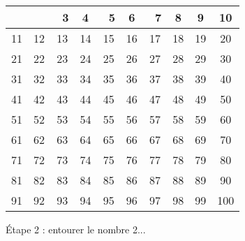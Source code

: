 \documentclass[a4paper]{beamer}
\begin{document}
\begin{frame}
	\begin{center}
		\begin{tabular}{|c|c|c|c|c|c|c|c|c|c|}
			\hline
			\xcancel{1} & \circled{\ 2} & \ 3 & 4  & \ 5 & 6  & \ 7 & 8  & 9  & 10  \\ \hline
			11          & 12            & 13  & 14 & 15  & 16 & 17  & 18 & 19 & 20  \\ \hline
			21          & 22            & 23  & 24 & 25  & 26 & 27  & 28 & 29 & 30  \\ \hline
			31          & 32            & 33  & 34 & 35  & 36 & 37  & 38 & 39 & 40  \\ \hline
			41          & 42            & 43  & 44 & 45  & 46 & 47  & 48 & 49 & 50  \\ \hline
			51          & 52            & 53  & 54 & 55  & 56 & 57  & 58 & 59 & 60  \\ \hline
			61          & 62            & 63  & 64 & 65  & 66 & 67  & 68 & 69 & 70  \\ \hline
			71          & 72            & 73  & 74 & 75  & 76 & 77  & 78 & 79 & 80  \\ \hline
			81          & 82            & 83  & 84 & 85  & 86 & 87  & 88 & 89 & 90  \\ \hline
			91          & 92            & 93  & 94 & 95  & 96 & 97  & 98 & 99 & 100 \\ \hline
		\end{tabular}

		Étape 2 : entourer le nombre 2...
	\end{center}
\end{frame}
\end{document}
